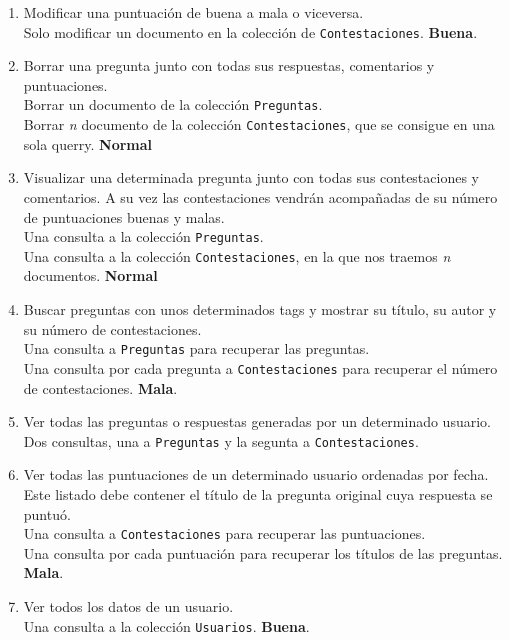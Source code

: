 \documentclass{article}
\begin{document}
\begin{enumerate}
      \item Modificar una puntuación de buena a mala o viceversa. \\
        Solo modificar un documento en la colección de \texttt{Contestaciones}. \textbf{Buena}.
      \item Borrar una pregunta junto con todas sus respuestas, comentarios y puntuaciones. \\ 
        Borrar un documento de la colección \texttt{Preguntas}. \\
        Borrar \emph{n} documento de la colección \texttt{Contestaciones}, que
        se consigue en una sola querry.  \textbf{Normal}
      \item Visualizar una determinada pregunta junto con todas sus contestaciones
        y comentarios. A su vez las contestaciones vendrán acompañadas de su
        número de puntuaciones buenas y malas. \\
        Una consulta a la colección \texttt{Preguntas}. \\
        Una consulta a la colección \texttt{Contestaciones}, en la que nos
        traemos \emph{n} documentos.  \textbf{Normal}
      \item Buscar preguntas con unos determinados tags y mostrar su título, su autor
        y su número de contestaciones. \\
        Una consulta a \texttt{Preguntas} para recuperar las preguntas. \\
        Una consulta por cada pregunta a \texttt{Contestaciones} para recuperar
        el número de contestaciones. \textbf{Mala}.
      \item Ver todas las preguntas o respuestas generadas por un determinado usuario. \\
        Dos consultas, una a \texttt{Preguntas} y la segunta a \texttt{Contestaciones}.
      \item Ver todas las puntuaciones de un determinado usuario ordenadas por fecha.
        Este listado debe contener el título de la pregunta original cuya respuesta
        se puntuó. \\ 
        Una consulta a \texttt{Contestaciones} para recuperar las puntuaciones. \\
        Una consulta por cada puntuación para recuperar los títulos de las
        preguntas. \textbf{Mala}.
      \item Ver todos los datos de un usuario.\\
        Una consulta a la colección \texttt{Usuarios}. \textbf{Buena}.

\end{enumerate}
\end{document}
